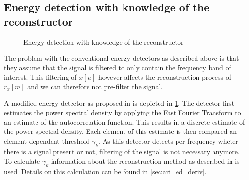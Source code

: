 \documentclass[a4paper, openany, oneside]{memoir}
\begin{document}
\subsection{Energy detection with knowledge of the reconstructor}\label{ssec:ari_ed}
\begin{figure}[H]
\centering
{}
\caption{Energy detection with knowledge of the reconstructor}\label{tkz:ed_ari_overview}
\end{figure}
The problem with the conventional energy detectors as described above is that they assume that the signal is filtered to only contain the frequency band of interest. This filtering of  $x[n]$ however affects the reconstruction process of $r_x[m]$ and we can therefore not pre-filter the signal. 

A modified energy detector as proposed in \cite{ariananda2012compressive} is depicted in \cref{tkz:ed_ari_overview}. The detector first estimates the power spectral density by applying the Fast Fourier Transform to an estimate of the autocorrelation function. This results in a discrete estimate of the power spectral density. Each element of this estimate is then compared an element-dependent threshold $\gamma_k$. As this detector detects per frequency wheter there is a signal present or not, filtering of the signal is not necessary anymore.
To calculate $\gamma_k$ information about the reconstruction method as described in  is used. Details on this calculation can be found in \cref{sec:ari_ed_deriv}.

\end{document}
